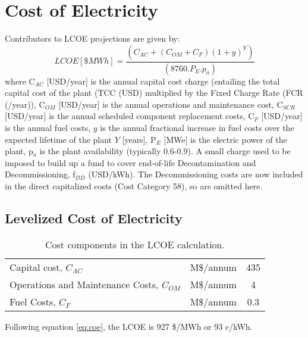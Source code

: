 \newpage 

\section{Cost of Electricity} 

 Contributors to LCOE projections are given by: 
 \begin{equation} 
 LCOE [\$ MWh] = \frac{(C_{AC} + (C_{OM} + C_{F})(1+y)^Y)}{(8760.P_E.p_a)} 
 \label{eq:coe}
\end{equation} 
where C$_{AC}$ [USD/year] is the annual capital cost charge (entailing the total capital cost of the plant (TCC (USD) multiplied by the Fixed Charge Rate (FCR (/year)), C$_{OM}$ [USD/year] is the annual operations and maintenance cost, C$_{SCR}$ [USD/year] is the annual scheduled component replacement costs, C$_{F}$ [USD/year] is the annual fuel costs, $y$ is the annual fractional increase in fuel costs over the expected lifetime of the plant $Y$ [years], P$_{E}$ [MWe] is the electric power of the plant, p$_{a}$ is the plant availability (typically 0.6-0.9).  A small charge used to be imposed to build up a fund to cover end-of-life Decontamination and Decommissioning, f$_{DD}$ (USD/kWh).  The Decommissioning costs are now included in the direct capitalized costs (Cost Category 58), so are omitted here.







\subsection{Levelized Cost of Electricity} 

\begin{table}[h!] 
\begin{tabular}{l c c } 
Capital cost, $C_{AC}$ &     M\$/annum    &    435      \\ 
Operations and Maintenance Costs, $C_{OM}$ & M\$/annum  &      4 \\ 
Fuel Costs, $C_{F}$ & M\$/annum  &       0.3 \\ 
    \end{tabular} 
    \caption{Cost components in the LCOE calculation.}
    \label{tab:lcoe} 
\end{table} 

Following equation \ref{eq:coe}, the LCOE is 927 \$/MWh or 93 c/kWh. 


